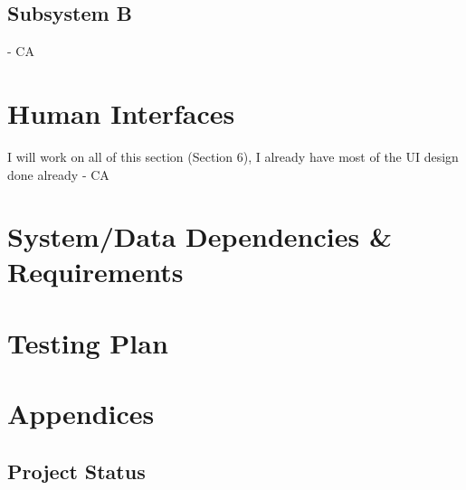 \documentclass[12pt]{article}
\begin{document}
\subsection{Subsystem B}
- CA
\section{Human Interfaces}
I will work on all of this section (Section 6), I already have most of the UI design done already - CA
\section{System/Data Dependencies \& Requirements}
\section{Testing Plan}
\section{Appendices}
\subsection{Project Status}



\end{document}
